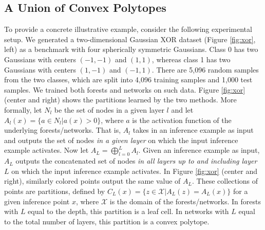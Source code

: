 \subsection{A Union of Convex Polytopes}
To provide a concrete illustrative example, consider the following experimental setup. We generated a two-dimensional Gaussian XOR dataset (Figure \ref{fig:xor}, left) as a benchmark with four spherically symmetric Gaussians. Class 0 has two Gaussians with centers $(-1,-1)$ and $(1,1)$, whereas class 1 has two Gaussians with centers $(1,-1)$ and $(-1,1)$. There are 5,096 random samples from the two classes, which are split into 4,096 training samples and 1,000 test samples. We trained both forests and networks on such data. Figure \ref{fig:xor} (center and right) shows the partitions learned by the two methods. More formally, let $N_l$ be the set of nodes in a given layer $l$ and let $A_l(x) = \{a \in N_l | a(x) > 0\}$, where $a$ is the activation function of the underlying forests/networks. That is, $A_l$ takes in an inference example as input and outputs the set of nodes \textit{in a given layer} on which the input inference example activates. Now let $A_L = \bigoplus_{l = 0}^L A_l$.
Given an inference example as input, $A_L$ outputs the concatenated set of nodes \textit{in all layers up to and including layer $L$} on which the input inference example activates. 
In Figure \ref{fig:xor} (center and right), similarly colored points output the same value of $A_L$. 
These collections of points are partitions, defined by $C_L(x) = \{z \in \mathcal{X} | A_L(z) = A_L(x)\}$ for a given inference point $x$, where $\mathcal{X}$ is the domain of the forests/networks.
In forests with $L$ equal to the depth, this partition is a leaf cell. In networks with $L$ equal to the total number of layers, this partition is a convex polytope.


